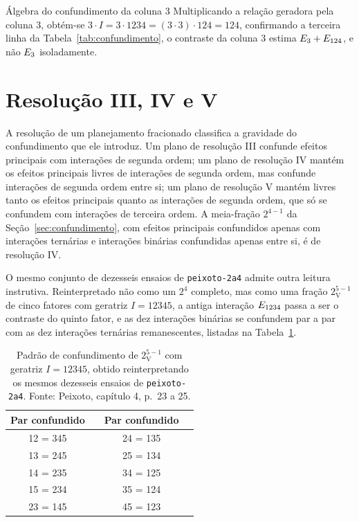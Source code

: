 \documentclass{doeapostila}
\begin{document}
\begin{aplicacao}{Álgebra do confundimento da coluna 3}
  Multiplicando a relação geradora pela coluna 3, obtém-se
  $3 \cdot I = 3 \cdot 1234 = (3 \cdot 3) \cdot 124 = 124$, confirmando a
  terceira linha da Tabela~\ref{tab:confundimento}, o contraste da coluna 3
  estima $E_{3} + E_{124}$, e não $E_{3}$ isoladamente.
\end{aplicacao}

\section{Resolução III, IV e V}
\label{sec:resolucao}

A resolução de um planejamento fracionado classifica a gravidade do
confundimento que ele introduz. Um plano de resolução III confunde efeitos
principais com interações de segunda ordem; um plano de resolução IV mantém
os efeitos principais livres de interações de segunda ordem, mas confunde
interações de segunda ordem entre si; um plano de resolução V mantém livres
tanto os efeitos principais quanto as interações de segunda ordem, que só se
confundem com interações de terceira ordem. A meia-fração $2^{4-1}$ da
Seção~\ref{sec:confundimento}, com efeitos principais confundidos apenas com
interações ternárias e interações binárias confundidas apenas entre si, é de
resolução IV.

O mesmo conjunto de dezesseis ensaios de \texttt{peixoto-2a4} admite outra
leitura instrutiva. Reinterpretado não como um $2^{4}$ completo, mas como uma
fração $2^{5-1}_{\mathrm{V}}$ de cinco fatores com geratriz $I = 12345$, a
antiga interação $E_{1234}$ passa a ser o contraste do quinto fator, e
as dez interações binárias se confundem par a par com as dez interações
ternárias remanescentes, listadas na Tabela~\ref{tab:resolucao-v}.

\begin{table}[H]
  \centering
  \caption{Padrão de confundimento de $2^{5-1}_{\mathrm{V}}$ com geratriz
    $I = 12345$, obtido reinterpretando os mesmos dezesseis ensaios de
    \texttt{peixoto-2a4}. Fonte: Peixoto, capítulo 4, p.~23 a 25.}
  \label{tab:resolucao-v}
  \begin{tabular}{c c c c}
    \toprule
    Par confundido & & Par confundido & \\
    \midrule
    12 = 345 & & 24 = 135 & \\
    13 = 245 & & 25 = 134 & \\
    14 = 235 & & 34 = 125 & \\
    15 = 234 & & 35 = 124 & \\
    23 = 145 & & 45 = 123 & \\
    \bottomrule
  \end{tabular}
\end{table}
\end{document}
